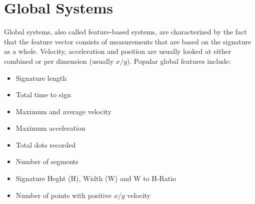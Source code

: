 \documentclass[a4paper, oneside]{csthesis}
\begin{document}





\section{Global Systems}
\label{sec:features}

Global systems, also called feature-based systems, are characterized by the fact that the feature vector consists of measurements that are based on the signature as a whole. Velocity, acceleration and position are usually looked at either combined or per dimension (usually $x/y$). Popular global features include:

\begin{itemize}
\item Signature length
\item Total time to sign
\item Maximum and average velocity
\item Maximum acceleration
\item Total dots recorded
\item Number of segments
\item Signature Heght (H), Width (W) and W to H-Ratio
\item Number of points with positive $x$/$y$ velocity
\end{itemize}
\end{document}
